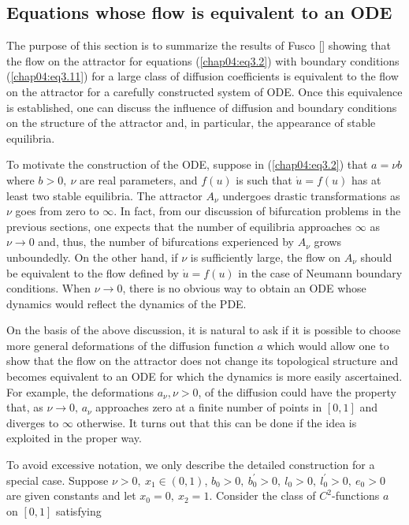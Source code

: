 \documentclass{surv-l}
\theoremstyle{plain}
\theoremstyle{definition}
\numberwithin{equation}{section}
\numberwithin{figure}{chapter}
\begin{document}
\subsection{Equations whose flow is equivalent to an ODE}\label{subsec4.3.6} The purpose of this section is to summarize the results of Fusco [\citeyear{1987f}] showing that the flow on the attractor for equations (\ref{chap04:eq3.2}) with boundary conditions (\ref{chap04:eq3.11}) for a large class of diffusion coefficients is equivalent to the flow on the attractor for a carefully constructed system of ODE. Once this equivalence is established, one can discuss the influence of diffusion and boundary conditions on the structure of the attractor and, in particular, the appearance of stable equilibria.

To motivate the construction of the ODE, suppose in (\ref{chap04:eq3.2}) that $a=\nu b$ where $b>0,\ \nu$ are real parameters, and $f(u)$ is such that $\dot{u}=f(u)$ has at least two stable equilibria. The attractor $A_{\nu}$ undergoes drastic transformations as $\nu$ goes from zero to $\infty$. In fact, from our discussion of bifurcation problems in the previous sections, one expects that the number of equilibria approaches $\infty$ as $\nu \rightarrow 0$ and, thus, the number of bifurcations experienced by $A_{\nu}$ grows unboundedly. On the other hand, if $\nu$ is sufficiently large, the flow on $A_{\nu}$ should be equivalent to the flow defined by $\dot{u}=f(u)$ in the case of Neumann boundary conditions. When $\nu \rightarrow 0$, there is no obvious way to obtain an ODE whose dynamics would reflect the dynamics of the PDE.

On the basis of the above discussion, it is natural to ask if it is possible to choose more general deformations of the diffusion function $a$ which would allow one to show that the flow on the attractor does not change its topological structure and becomes equivalent to an ODE for which the dynamics is more easily ascertained. For example, the deformations $a_{\nu},\nu > 0$, of the diffusion could have the property that, as $\nu \rightarrow 0,\,a_{\nu}$ approaches zero at a finite number of points in $[0,1]$ and diverges to $\infty$ otherwise. It turns out that this can be done if the idea is exploited in the proper way.\

To avoid excessive notation, we only describe the detailed construction for a special case. Suppose $\nu >0,\ x_{1}\in(0,1)$, $b_{0}>0,\ b_{0}^{\prime}>0,\ l_{0}>0,\ l_{0}^{\prime}>0,\ e_{0}>0$ are given constants and let $x_{0}=0,\ x_{2}=1$. Consider the class of $C^{2}$-functions $a$ on $[0,1]$ satisfying
\end{document}
